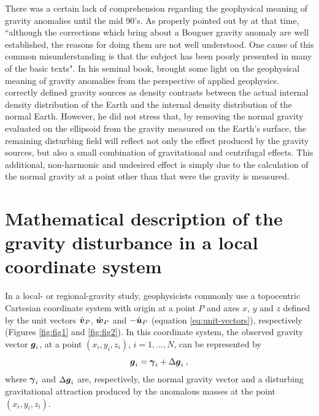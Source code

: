 \documentclass[extra]{gji}
\begin{document}
There was a certain lack of comprehension regarding the
geophysical meaning of gravity anomalies until the
mid 90's.
As properly pointed out by \citet{chapin1996} at that time, 
``although the corrections which bring about a Bouguer 
gravity anomaly are well established, the reasons for doing
them are not well understood. One cause of this common 
misunderstanding is that the subject has been poorly presented in
many of the basic texts".
In his seminal book, \citet{blakely1996} brought some light
on the geophysical meaning of gravity anomalies from the 
perspective of applied geophysics. \citet{blakely1996} correctly
defined gravity sources as density contrasts between the actual
internal density distribution of the Earth and the internal density
distribution of the normal Earth.
However, he did not stress that, by removing the normal gravity 
evaluated on the ellipsoid from the gravity measured 
on the Earth's surface, the remaining disturbing field will reflect 
not only the effect produced by the gravity sources, but also a
small combination of gravitational and centrifugal effects.
This additional, non-harmonic and undesired effect is 
simply due to the calculation of the normal gravity at a point
other than that were the gravity is measured.


\section{Mathematical description of the gravity disturbance in a local coordinate system}

In a local- or regional-gravity study, 
geophysicists commonly use a topocentric Cartesian coordinate system
with origin at a point $P$ and axes $x$, $y$ and $z$ defined
by the unit vectors $\hat{\mitbf{v}}_{P}$,
$\hat{\mitbf{w}}_{P}$ and $-\hat{\mitbf{u}}_{P}$ 
(equation \ref{eq:unit-vectors}), respectively
(Figures \ref{fig:fig1} and \ref{fig:fig2}).
In this coordinate system, the observed gravity vector
$\mitbf{g}_{i}$, at a point $(x_{i}, y_{i}, z_{i})$, 
$i = 1, ..., N$, can be represented by
\begin{equation}
\mitbf{g}_{i} = \mitbf{\gamma}_{i} + \Delta \mitbf{g}_{i} \: ,
\label{eq:gravity-vector}
\end{equation}
where $\mitbf{\gamma}_{i}$ and $\Delta \mitbf{g}_{i}$
are, respectively, the normal gravity vector and a
disturbing gravitational attraction produced by the anomalous 
masses at the point $(x_{i}, y_{i}, z_{i})$.
\end{document}
